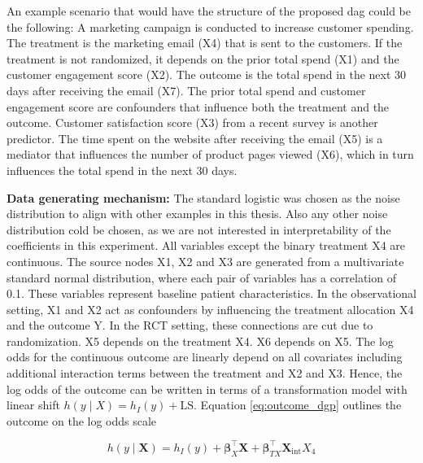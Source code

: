 % 



An example scenario that would have the structure of the proposed dag could be the following: A marketing campaign is conducted to increase customer spending. The treatment is the marketing email (X4) that is sent to the customers. If the treatment is not randomized, it depends on the prior total spend (X1) and the customer engagement score (X2). The outcome is the total spend in the next 30 days after receiving the email (X7). The prior total spend and customer engagement score are confounders that influence both the treatment and the outcome. Customer satisfaction score (X3) from a recent survey is another predictor. The time spent on the website after receiving the email (X5) is a mediator that influences the number of product pages viewed (X6), which in turn influences the total spend in the next 30 days. 


\textbf{Data generating mechanism:} The standard logistic was chosen as the noise distribution to align with other examples in this thesis. Also any other noise distribution cold be chosen, as we are not interested in interpretability of the coefficients in this experiment. All variables except the binary treatment X4 are continuous. The source nodes X1, X2 and X3 are generated from a multivariate standard normal distribution, where each pair of variables has a correlation of 0.1. These variables represent baseline patient characteristics. In the observational setting, X1 and X2 act as confounders by influencing the treatment allocation X4 and the outcome Y. In the RCT setting, these connections are cut due to randomization. X5 depends on the treatment X4. X6 depends on X5. The log odds for the continuous outcome are linearly depend on all covariates including additional interaction terms between the treatment and X2 and X3. Hence, the log odds of the outcome can be written in terms of a transformation model with linear shift $h(y \mid X) = h_I(y) + \text{LS}$. Equation \ref{eq:outcome_dgp} outlines the outcome on the log odds scale



\begin{equation}
h(y \mid \mathbf{X}) = h_I(y) + \boldsymbol{\beta}_X^\top \mathbf{X} + \boldsymbol{\beta}_{TX}^\top \mathbf{X}_{\text{int}}  X_4
\label{eq:outcome_dgp}
\end{equation}

